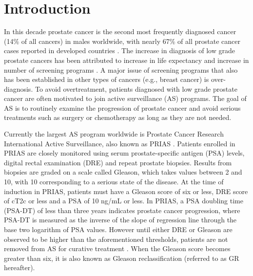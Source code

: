 \section{Introduction}
\label{sec : introduction}
In this decade prostate cancer is the second most frequently diagnosed cancer (14\% of all cancers) in males worldwide, with nearly 67\% of all prostate cancer cases reported in developed countries \citep{GlobalCancerStats2012}. The increase in diagnosis of low grade prostate cancers has been attributed to increase in life expectancy and increase in number of screening programs \citep{potoskyPSAcancer}. A major issue of screening programs that also has been established in other types of cancers (e.g., breast cancer) is over-diagnosis. To avoid overtreatment, patients diagnosed with low grade prostate cancer are often motivated to join active surveillance (AS) programs. The goal of AS is to routinely examine the progression of prostate cancer and avoid serious treatments such as surgery or chemotherapy as long as they are not needed.

Currently the largest AS program worldwide is Prostate Cancer Research International Active Surveillance, also known as PRIAS \citep{bokhorst2016decade}. Patients enrolled in PRIAS are closely monitored using serum prostate-specific antigen (PSA) levels, digital rectal examination (DRE) and repeat prostate biopsies. Results from biopsies are graded on a scale called Gleason, which takes values between 2 and 10, with 10 corresponding to a serious state of the disease. At the time of induction in PRIAS, patients must have a Gleason score of six or less, DRE score of cT2c or less and a PSA of 10 ng/mL or less. In PRIAS, a PSA doubling time (PSA-DT) of less than three years indicates prostate cancer progression, where PSA-DT is measured as the inverse of the slope of regression line through the base two logarithm of PSA values. However until either DRE or Gleason are observed to be higher than the aforementioned thresholds, patients are not removed from AS for curative treatment \citep{bokhorst2016decade}. When the Gleason score becomes greater than six, it is also known as Gleason reclassification (referred to as GR hereafter).

